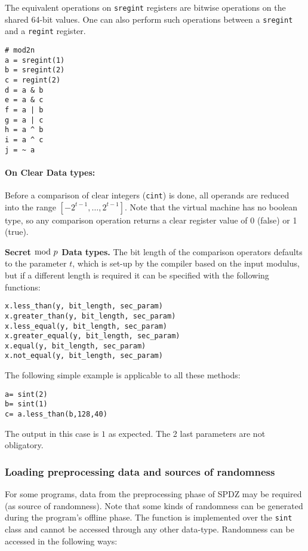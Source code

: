 The equivalent operations on \verb|sregint| registers are bitwise operations on the
shared 64-bit values. One can also perform such operations between a
\verb|sregint| and a \verb|regint| register.
\begin{lstlisting}
# mod2n
a = sregint(1)
b = sregint(2)
c = regint(2)
d = a & b
e = a & c
f = a | b
g = a | c
h = a ^ b
i = a ^ c
j = ~ a
\end{lstlisting}

\paragraph{On Clear Data types:} Before a comparison of clear integers (\verb|cint|) is done,
all operands are reduced into the range $[-2^{t-1}, \dots, 2^{t-1}]$.
Note that the virtual machine has no boolean type,
so any comparison operation returns a clear register value of 0
(false) or 1 (true).

\noindent
\textbf{Secret $\bmod \; p$ Data types.}
The bit length of the comparison operators defaults to the parameter $t$,
which is set-up by the compiler based on the input modulus,
but if a different length is required it can be specified with the following functions:

\begin{lstlisting}
x.less_than(y, bit_length, sec_param)
x.greater_than(y, bit_length, sec_param)
x.less_equal(y, bit_length, sec_param)
x.greater_equal(y, bit_length, sec_param)
x.equal(y, bit_length, sec_param)
x.not_equal(y, bit_length, sec_param)
\end{lstlisting}

\noindent
The following simple example is applicable to all these methods:
\begin{lstlisting}
a= sint(2)
b= sint(1)
c= a.less_than(b,128,40)
\end{lstlisting}
The output in this case is $1$ as expected. The 2 last parameters are not obligatory.


\subsubsection{Loading preprocessing data and sources of randomness}

For some programs, data from the preprocessing phase of SPDZ may be required (as source of randomness). Note that some kinds of randomness can  be generated during the program's offline phase. The function is implemented over the \verb|sint| class and cannot be accessed through any other data-type. Randomness can be accessed in the following ways:

